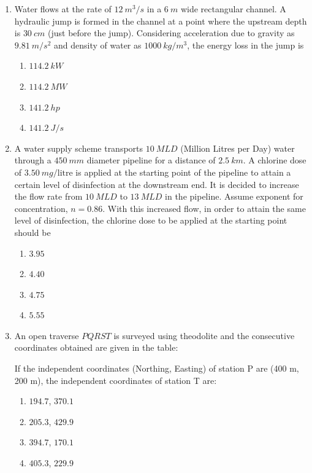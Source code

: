\documentclass[journal]{IEEEtran}
\begin{document}
\begin{enumerate}
\item Water flows at the rate of $12 \ m^3/s$ in a $6 \ m$ wide rectangular channel. A hydraulic jump is formed in the channel at a point where the upstream depth is $30 \ cm$ (just before the jump). Considering acceleration due to gravity as $9.81 \ m/s^2$ and density of water as $1000 \ kg/m^3$, the energy loss in the jump is  \hfill {}
\begin{enumerate}
\item $114.2 \ kW$  
\item $114.2 \ MW$  
\item $141.2 \ hp$  
\item $141.2 \ J/s$  
\end{enumerate}

\item A water supply scheme transports $10 \ MLD$ (Million Litres per Day) water through a $450 \ mm$ diameter pipeline for a distance of $2.5 \ km$. A chlorine dose of $3.50 \ mg/\text{litre}$ is applied at the starting point of the pipeline to attain a certain level of disinfection at the downstream end. It is decided to increase the flow rate from $10 \ MLD$ to $13 \ MLD$ in the pipeline. Assume exponent for concentration, $n = 0.86$. With this increased flow, in order to attain the same level of disinfection, the chlorine dose  to be applied at the starting point should be  \hfill {}
\begin{enumerate}
\item $3.95$  
\item $4.40$  
\item $4.75$  
\item $5.55$  
\end{enumerate}

\item An open traverse $PQRST$ is surveyed using theodolite and the consecutive coordinates obtained are given in the table:  



If the independent coordinates (Northing, Easting) of station P are (400 m, 200 m), the independent coordinates  of station T are:  \hfill {}
\begin{enumerate}
\item $194.7$, $370.1$  
\item $205.3$, $429.9$  
\item $394.7$, $170.1$  
\item $405.3$, $229.9$  
\end{enumerate}


\end{enumerate}
\end{document}
